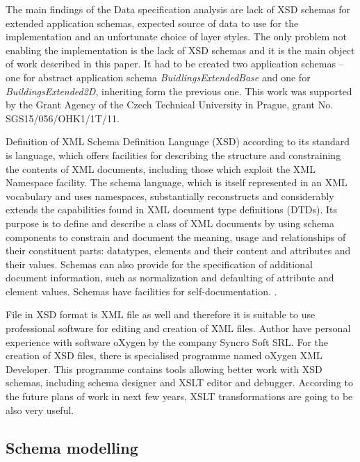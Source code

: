 \documentclass[eprint]{actapoly}
\begin{document}
The main findings of the Data specification analysis are lack of XSD schemas for extended application schemas, expected source of data to use for the implementation and an unfortunate choice of layer styles. The only problem not enabling the implementation is the lack of XSD schemas and it is the main object of work described in this paper. It had to be created two application schemas -- one for abstract application schema \textit{BuidlingsExtendedBase} and one for \textit{BuildingsExtended2D}, inheriting form the previous one. This work was supported by the Grant Agency of the Czech Technical University in Prague, grant No. SGS15/056/OHK1/1T/11.

Definition of XML Schema Definition Language (XSD) according to its standard is language, which offers facilities for describing the structure and constraining the contents of XML documents, including those which exploit the XML Namespace facility. The schema language, which is itself represented in an XML vocabulary and uses namespaces, substantially reconstructs and considerably extends the capabilities found in XML document type definitions (DTDs). Its purpose is to define and describe a class of XML documents by using schema components to constrain and document the meaning, usage and relationships of their constituent parts: datatypes, elements and their content and attributes and their values. Schemas can also provide for the specification of additional document information, such as normalization and defaulting of attribute and element values. Schemas have facilities for self-documentation. \cite{XSD - http://www.w3.org/TR/xmlschema11-1/}.

File in XSD format is XML file as well and therefore it is suitable to use professional software for editing and creation of XML files. Author have personal experience with software oXygen by the company Syncro Soft SRL. For the creation of XSD files, there is specialised programme named oXygen XML Developer. This programme contains tools allowing better work with XSD schemas, including schema designer and XSLT editor and debugger. According to the future plans of work in next few years, XSLT transformations are going to be also very useful. 

\subsection{Schema modelling}
\label{sec:modelling}
\end{document}
